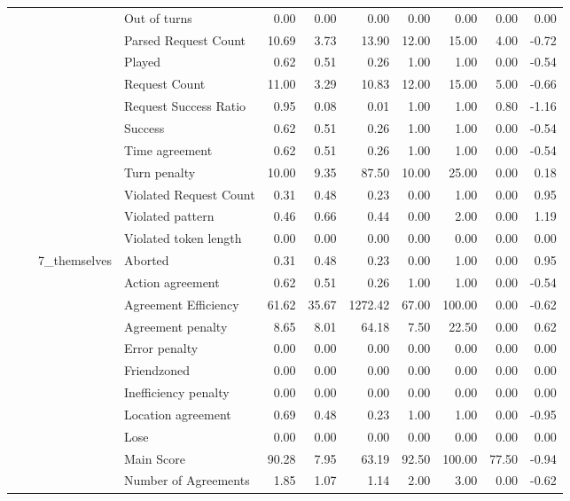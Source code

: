 \begin{tabular}{llllrrrrrrr}
 &  &  & Out of turns & 0.00 & 0.00 & 0.00 & 0.00 & 0.00 & 0.00 & 0.00 \\
 &  &  & Parsed Request Count & 10.69 & 3.73 & 13.90 & 12.00 & 15.00 & 4.00 & -0.72 \\
 &  &  & Played & 0.62 & 0.51 & 0.26 & 1.00 & 1.00 & 0.00 & -0.54 \\
 &  &  & Request Count & 11.00 & 3.29 & 10.83 & 12.00 & 15.00 & 5.00 & -0.66 \\
 &  &  & Request Success Ratio & 0.95 & 0.08 & 0.01 & 1.00 & 1.00 & 0.80 & -1.16 \\
 &  &  & Success & 0.62 & 0.51 & 0.26 & 1.00 & 1.00 & 0.00 & -0.54 \\
 &  &  & Time agreement & 0.62 & 0.51 & 0.26 & 1.00 & 1.00 & 0.00 & -0.54 \\
 &  &  & Turn penalty & 10.00 & 9.35 & 87.50 & 10.00 & 25.00 & 0.00 & 0.18 \\
 &  &  & Violated Request Count & 0.31 & 0.48 & 0.23 & 0.00 & 1.00 & 0.00 & 0.95 \\
 &  &  & Violated pattern & 0.46 & 0.66 & 0.44 & 0.00 & 2.00 & 0.00 & 1.19 \\
 &  &  & Violated token length & 0.00 & 0.00 & 0.00 & 0.00 & 0.00 & 0.00 & 0.00 \\
\cline{3-11}
 &  & \multirow[t]{27}{*}{7_themselves} & Aborted & 0.31 & 0.48 & 0.23 & 0.00 & 1.00 & 0.00 & 0.95 \\
 &  &  & Action agreement & 0.62 & 0.51 & 0.26 & 1.00 & 1.00 & 0.00 & -0.54 \\
 &  &  & Agreement Efficiency & 61.62 & 35.67 & 1272.42 & 67.00 & 100.00 & 0.00 & -0.62 \\
 &  &  & Agreement penalty & 8.65 & 8.01 & 64.18 & 7.50 & 22.50 & 0.00 & 0.62 \\
 &  &  & Error penalty & 0.00 & 0.00 & 0.00 & 0.00 & 0.00 & 0.00 & 0.00 \\
 &  &  & Friendzoned & 0.00 & 0.00 & 0.00 & 0.00 & 0.00 & 0.00 & 0.00 \\
 &  &  & Inefficiency penalty & 0.00 & 0.00 & 0.00 & 0.00 & 0.00 & 0.00 & 0.00 \\
 &  &  & Location agreement & 0.69 & 0.48 & 0.23 & 1.00 & 1.00 & 0.00 & -0.95 \\
 &  &  & Lose & 0.00 & 0.00 & 0.00 & 0.00 & 0.00 & 0.00 & 0.00 \\
 &  &  & Main Score & 90.28 & 7.95 & 63.19 & 92.50 & 100.00 & 77.50 & -0.94 \\
 &  &  & Number of Agreements & 1.85 & 1.07 & 1.14 & 2.00 & 3.00 & 0.00 & -0.62 \\

\end{tabular}
